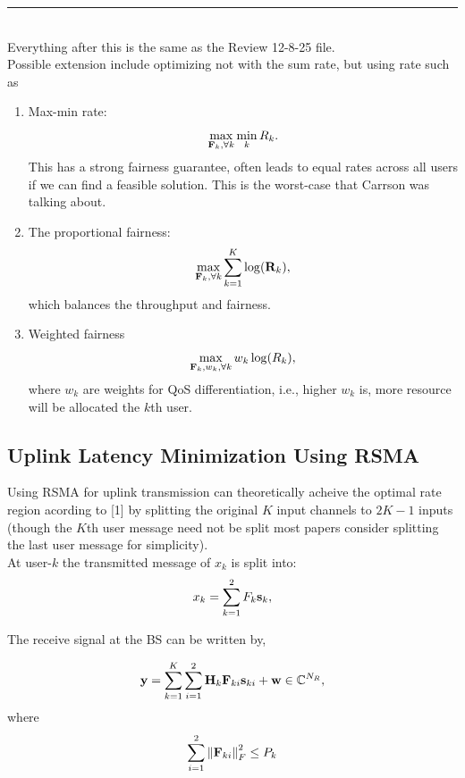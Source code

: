 \documentclass[a4paper, 12pt, onecolumn, journal, twoside, draftclsnofoot]{IEEEtran}
\begin{document}
\noindent\rule{16cm}{0.4pt} \\

Everything after this is the same as the Review 12-8-25 file. \\

Possible extension include optimizing not with the sum rate, but using rate such as
\begin{enumerate}[1.]
	\item Max-min rate: 
	\begin{equation*}
		\max_{{\bf F}_k, \forall k}  \min_k  R_k.
	\end{equation*}
This has a strong fairness guarantee, often leads to equal rates across all users if we can find a feasible solution.  This is the worst-case that Carrson was talking about.
	\item The proportional fairness:
	\begin{equation*}
		\max_{{\bf F}_k, \forall k}   \sum_{k=1}^K  \log ({\bf R}_k), 
	\end{equation*}
which balances the throughput and fairness. 
	\item Weighted fairness 
	\begin{equation*}
		\max_{{\bf F}_k, w_k, \forall k}  w_k \log (R_k), 
	\end{equation*}
where $w_k$ are weights for QoS differentiation, i.e., higher $w_k$ is, more resource will be allocated the $k$th user.
\end{enumerate}


\subsection{Uplink Latency Minimization Using RSMA}
Using RSMA for uplink transmission can theoretically acheive the optimal rate region acording to [1] by splitting the original $K$ input channels to $2K-1$ inputs (though the $K$th user message need not be split most papers consider splitting the last user message for simplicity). \\


At user-$k$ the transmitted message of $x_k$ is split into:
\begin{equation*}
	x_k = \sum_{k=1}^2  \\F_k {\bf s}_k,
\end{equation*}


The receive signal at the BS can be written by,

\begin{equation*}
	{\bf y} = \sum_{k=1}^K \sum_{i=1}^2 {\bf H}_k {\bf F}_{ki} {\bf s}_{ki} + {\bf w} \in \mathbb{C}^{N_R},
\end{equation*}
where
\begin{equation*}
    \sum_{i=1}^2 \left\| {\bf F}_{ki} \right\|_F^2  \leq P_k
\end{equation*}
\end{document}

